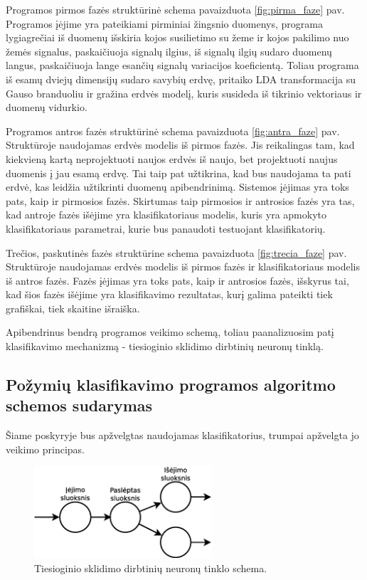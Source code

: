 \documentclass[]{vgtuef}
\begin{document}
Programos pirmos fazės struktūrinė schema pavaizduota
\ref{fig:pirma_faze} pav. Programos įėjime yra pateikiami pirminiai
žingsnio duomenys, programa lygiagrečiai iš duomenų išskiria kojos
susilietimo su žeme ir kojos pakilimo nuo žemės signalus, paskaičiuoja
signalų ilgius, iš signalų ilgių sudaro duomenų langus, paskaičiuoja
lange esančių signalų variacijos koeficientą. Toliau programa iš esamų
dviejų dimensijų sudaro savybių erdvę, pritaiko LDA transformacija su
Gauso branduoliu ir gražina erdvės modelį, kuris susideda iš tikrinio
vektoriaus ir duomenų vidurkio.

Programos antros fazės struktūrinė schema pavaizduota
\ref{fig:antra_faze} pav. Struktūroje naudojamas erdvės modelis iš
pirmos fazės. Jis reikalingas tam, kad kiekvieną kartą neprojektuoti
naujos erdvės iš naujo, bet projektuoti naujus duomenis į jau esamą
erdvę. Tai taip pat užtikrina, kad bus naudojama ta pati erdvė, kas
leidžia užtikrinti duomenų apibendrinimą. Sistemos įėjimas yra toks
pats, kaip ir pirmosios fazės. Skirtumas taip pirmosios ir antrosios
fazės yra tas, kad antroje fazės išėjime yra klasifikatoriaus modelis,
kuris yra apmokyto klasifikatoriaus parametrai, kurie bus panaudoti
testuojant klasifikatorių.

Trečios, paskutinės fazės struktūrine schema pavaizduota
\ref{fig:trecia_faze} pav. Struktūroje naudojamas erdvės modelis iš
pirmos fazės ir klasifikatoriaus modelis iš antros fazės. Fazės
įėjimas yra toks pats, kaip ir antrosios fazės, išskyrus tai, kad šios
fazės išėjime yra klasifikavimo rezultatas, kurį galima pateikti tiek
grafiškai, tiek skaitine išraiška.

Apibendrinus bendrą programos veikimo schemą, toliau paanalizuosim
patį klasifikavimo mechanizmą - tiesioginio sklidimo dirbtinių neuronų tinklą.

\subsection{Požymių klasifikavimo programos algoritmo schemos sudarymas}
\label{subsec:class_scheme}

Šiame poskyryje bus apžvelgtas naudojamas klasifikatorius, trumpai
apžvelgta jo veikimo principas.

\begin{figure}[!t]
  \centering
  \includegraphics[width=250px]{figures/ffnn.eps}
  \caption{Tiesioginio sklidimo dirbtinių neuronų tinklo schema.}
  \label{fig:ffnn_schema}
\end{figure}
\end{document}
